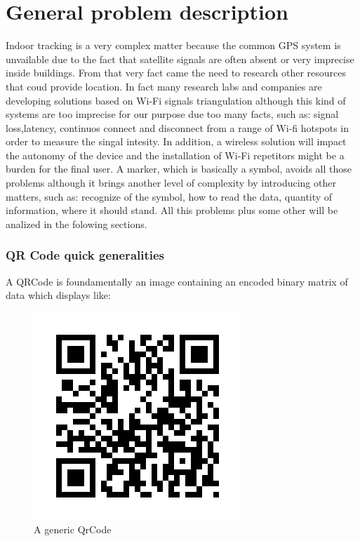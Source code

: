 \chapter{General problem description}
Indoor tracking is a very complex matter because the common GPS system is unvailable due to the fact that satellite signals are often absent or very imprecise inside buildings.
From that very fact came the need to research other resources that coud provide location.
In fact many research labs and companies are developing solutions based on Wi-Fi signals triangulation although this kind of systems are too imprecise for our purpose due too many facts, such as: signal loss,latency, continuos connect and disconnect from a range of Wi-fi hotspots in order to measure the singal intesity.
In addition, a wireless solution will impact the autonomy of the device and the installation of Wi-Fi repetitors might be a burden for the final user.
\newline
A marker, which is basically a symbol, avoids all those problems although it brings another level of complexity by introducing other matters, such as: recognize of the symbol, how to read the data, quantity of information, where it should stand.
All this problems plus some other will be analized in the folowing sections.

\subsection{QR Code quick generalities}
A QRCode is foundamentally an image containing an encoded binary matrix of data which displays like:
\begin{figure}[hbt]
    \centering
    \caption{A generic QrCode}
    \includegraphics[scale=0.5]{img/qr.png}
\end{figure}

